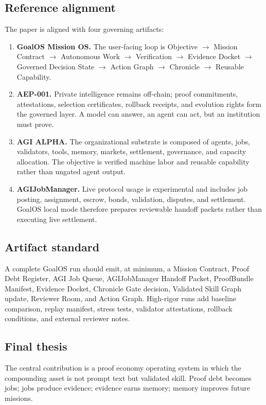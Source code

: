 \documentclass[11pt]{article}
\begin{document}
\subsection*{Reference alignment}
The paper is aligned with four governing artifacts:
\begin{enumerate}[leftmargin=1.35em,itemsep=0.25em,topsep=0.25em]
\item \textbf{GoalOS Mission OS.} The user-facing loop is Objective $\rightarrow$ Mission Contract $\rightarrow$ Autonomous Work $\rightarrow$ Verification $\rightarrow$ Evidence Docket $\rightarrow$ Governed Decision State $\rightarrow$ Action Graph $\rightarrow$ Chronicle $\rightarrow$ Reusable Capability.
\item \textbf{AEP-001.} Private intelligence remains off-chain; proof commitments, attestations, selection certificates, rollback receipts, and evolution rights form the governed layer. A model can answer, an agent can act, but an institution must prove.
\item \textbf{AGI ALPHA.} The organizational substrate is composed of agents, jobs, validators, tools, memory, markets, settlement, governance, and capacity allocation. The objective is verified machine labor and reusable capability rather than ungated agent output.
\item \textbf{AGIJobManager.} Live protocol usage is experimental and includes job posting, assignment, escrow, bonds, validation, disputes, and settlement. GoalOS local mode therefore prepares reviewable handoff packets rather than executing live settlement.
\end{enumerate}

\subsection*{Artifact standard}
A complete GoalOS run should emit, at minimum, a Mission Contract, Proof Debt Register, AGI Job Queue, AGIJobManager Handoff Packet, ProofBundle Manifest, Evidence Docket, Chronicle Gate decision, Validated Skill Graph update, Reviewer Room, and Action Graph. High-rigor runs add baseline comparison, replay manifest, stress tests, validator attestations, rollback conditions, and external reviewer notes.

\subsection*{Final thesis}
The central contribution is a proof economy operating system in which the compounding asset is not prompt text but validated skill. Proof debt becomes jobs; jobs produce evidence; evidence earns memory; memory improves future missions.
\end{document}
